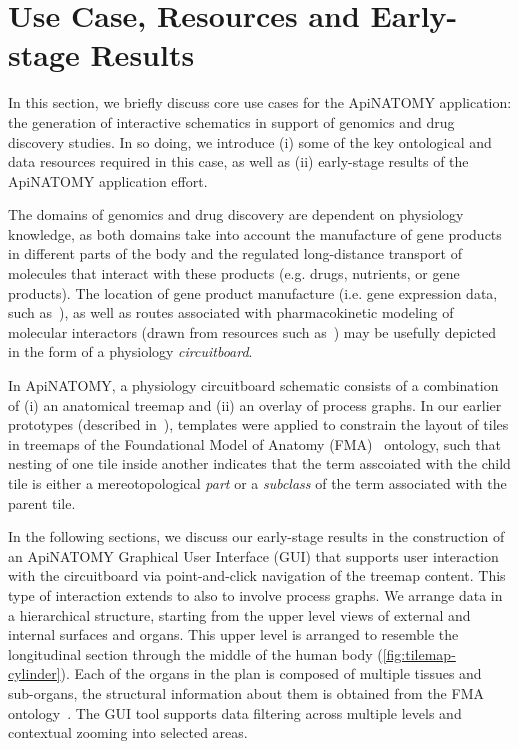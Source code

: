 \section{Use Case, Resources and Early-stage Results} \label{sect:motivation}            %

In this section, we briefly discuss core use cases for the ApiNATOMY application: the generation of interactive schematics in support of genomics and drug discovery studies. In so doing, we introduce (i) some of the key ontological and data resources required in this case, as well as (ii) early-stage results of the ApiNATOMY application effort.

The domains of genomics and drug discovery are dependent on physiology knowledge, as both domains take into account the manufacture of gene products in different parts of the body and the regulated long-distance transport of molecules that interact with these products (e.g. drugs, nutrients, or gene products). The location of gene product manufacture (i.e. gene expression data, such as~\cite{EBI}), as well as routes associated with pharmacokinetic modeling of molecular interactors (drawn from resources such as~\cite{HMC+13}) may be usefully depicted in the form of a physiology \emph{circuitboard}.

In ApiNATOMY, a physiology circuitboard schematic consists of a combination of (i) an anatomical treemap and (ii) an overlay of process graphs. In our earlier prototypes (described in~\cite{BGS12,KBK14}), templates were applied to constrain the layout of tiles in treemaps of the Foundational Model of Anatomy (FMA)~\cite{RM03} ontology, such that nesting of one tile inside another indicates that the term asscoiated with the child tile is either a mereotopological \emph{part} or a \emph{subclass} of the term associated with the parent tile. 

In the following sections, we discuss our early-stage results in the construction of an ApiNATOMY Graphical User Interface (GUI) that supports user interaction with the circuitboard via point-and-click navigation of the treemap content. This type of interaction extends to also to involve process graphs. We arrange data in a hierarchical structure, starting from the upper level views of external and internal surfaces and organs. This upper level is arranged to resemble the longitudinal section through the middle of the human body (\cref{fig:tilemap-cylinder}).
Each of the organs in the plan is composed of multiple tissues and sub-organs, the structural information about them is obtained from the FMA ontology~\cite{RM03}. The GUI tool supports data filtering across multiple levels and contextual zooming into selected areas.

